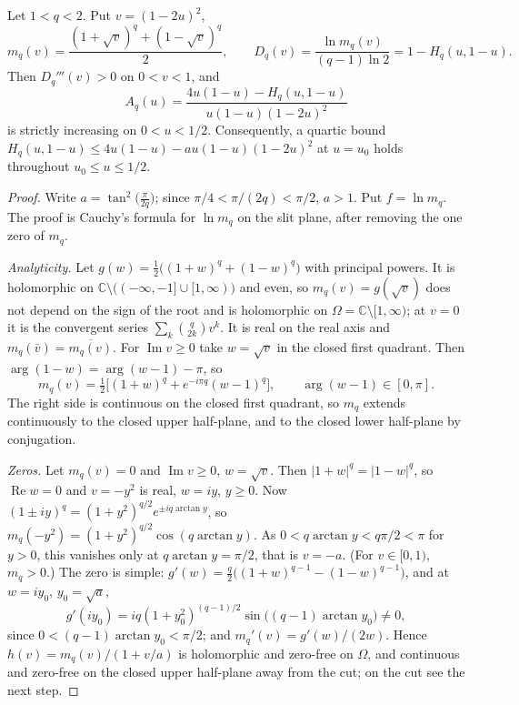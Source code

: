 \begin{lemma}\label{lem:fqe-binary-quartic}
Let $1<q<2$. Put $v=(1-2u)^2$,
\[
 m_q(v)=\frac{(1+\sqrt v)^q+(1-\sqrt v)^q}{2},\qquad
 D_q(v)=\frac{\ln m_q(v)}{(q-1)\ln2}=1-H_q(u,1-u).
\]
Then $D_q'''(v)>0$ on $0<v<1$, and
\[
 A_q(u)=\frac{4u(1-u)-H_q(u,1-u)}{u(1-u)(1-2u)^2}
\]
is strictly increasing on $0<u<1/2$.
Consequently, a quartic bound
$H_q(u,1-u)\le4u(1-u)-a u(1-u)(1-2u)^2$
at $u=u_0$ holds throughout $u_0\le u\le1/2$.
\end{lemma}
\begin{proof}
Write $a=\tan^2\!\bigl(\tfrac{\pi}{2q}\bigr)$; since $\pi/4<\pi/(2q)<\pi/2$, $a>1$. Put $f=\ln m_q$.
The proof is Cauchy's formula for $\ln m_q$ on the slit plane, after removing the one zero of $m_q$.

\emph{Analyticity.} Let $g(w)=\tfrac12\bigl((1+w)^q+(1-w)^q\bigr)$ with principal powers. It is holomorphic on
$\mathbb C\setminus\bigl((-\infty,-1]\cup[1,\infty)\bigr)$ and even, so $m_q(v)=g(\sqrt v)$ does not depend on the
sign of the root and is holomorphic on $\Omega=\mathbb C\setminus[1,\infty)$; at $v=0$ it is the convergent series
$\sum_k\binom q{2k}v^k$. It is real on the real axis and $m_q(\bar v)=\overline{m_q(v)}$.
For $\operatorname{Im}v\ge0$ take $w=\sqrt v$ in the closed first quadrant. Then $\arg(1-w)=\arg(w-1)-\pi$, so
\begin{equation}
 m_q(v)=\tfrac12\bigl[(1+w)^q+e^{-i\pi q}(w-1)^q\bigr],\qquad \arg(w-1)\in[0,\pi].
 \label{eq:fqe-bq-upper}
\end{equation}
The right side is continuous on the closed first quadrant, so $m_q$ extends continuously to the closed upper
half-plane, and to the closed lower half-plane by conjugation.

\emph{Zeros.} Let $m_q(v)=0$ and $\operatorname{Im}v\ge0$, $w=\sqrt v$. Then $|1+w|^q=|1-w|^q$, so $\operatorname{Re}w=0$ and $v=-y^2$
is real, $w=iy$, $y\ge0$. Now $(1\pm iy)^q=(1+y^2)^{q/2}e^{\pm iq\arctan y}$, so
$m_q(-y^2)=(1+y^2)^{q/2}\cos(q\arctan y)$. As $0<q\arctan y<q\pi/2<\pi$ for $y>0$, this vanishes only at
$q\arctan y=\pi/2$, that is $v=-a$. (For $v\in[0,1)$, $m_q>0$.) The zero is simple:
$g'(w)=\tfrac q2\bigl((1+w)^{q-1}-(1-w)^{q-1}\bigr)$, and at $w=iy_0$, $y_0=\sqrt a$,
\[
 g'(iy_0)=iq(1+y_0^2)^{(q-1)/2}\sin\bigl((q-1)\arctan y_0\bigr)\ne0,
\]
since $0<(q-1)\arctan y_0<\pi/2$; and $m_q'(v)=g'(w)/(2w)$. Hence
$h(v)=m_q(v)/(1+v/a)$ is holomorphic and zero-free on $\Omega$, and continuous and zero-free on the closed upper
half-plane away from the cut; on the cut see the next step.


\end{proof}
